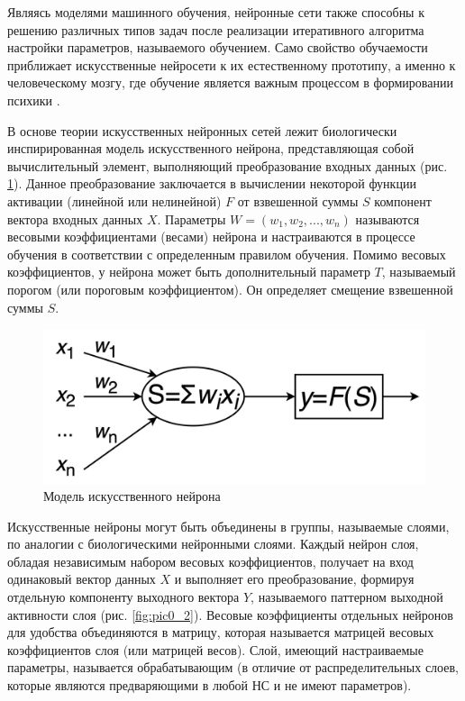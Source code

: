 Являясь моделями машинного обучения, нейронные сети также способны к решению различных типов задач после реализации итеративного алгоритма настройки параметров, называемого обучением. Само свойство обучаемости приближает искусственные нейросети к их естественному прототипу, а именно к человеческому мозгу, где обучение является важным процессом в формировании психики \cite{kandel}.

В основе теории искусственных нейронных сетей лежит биологически инспирированная модель искусственного нейрона, представляющая собой вычислительный элемент, выполняющий преобразование входных данных (рис. \ref{fig:pic0_1}). Данное преобразование заключается в вычислении некоторой функции активации (линейной или нелинейной) $F$ от взвешенной суммы $S$ компонент вектора входных данных $X$. Параметры $W = (w_1, w_2, ..., w_n)$ называются весовыми коэффициентами (весами) нейрона и настраиваются в процессе обучения в соответствии с определенным правилом обучения. Помимо весовых коэффициентов, у нейрона может быть дополнительный параметр $T$, называемый порогом (или пороговым коэффициентом). Он определяет смещение взвешенной суммы $S$.

\begin{figure}[H]
  \centering
  \includegraphics[width=\textwidth]{man-source/images/ch1/pic0-1.png}
  \caption{Модель искусственного нейрона}
  \label{fig:pic0_1}
\end{figure}

Искусственные нейроны могут быть объединены в группы, называемые слоями, по аналогии с биологическими нейронными слоями. Каждый нейрон слоя, обладая независимым набором весовых коэффициентов, получает на вход одинаковый вектор данных $X$ и выполняет его преобразование, формируя отдельную компоненту выходного вектора $Y$, называемого паттерном выходной активности слоя (рис. \ref{fig:pic0_2}). Весовые коэффициенты отдельных нейронов для удобства объединяются в матрицу, которая называется матрицей весовых коэффициентов слоя (или матрицей весов). Слой, имеющий настраиваемые параметры, называется обрабатывающим (в отличие от распределительных слоев, которые являются предваряющими в любой НС и не имеют параметров).

